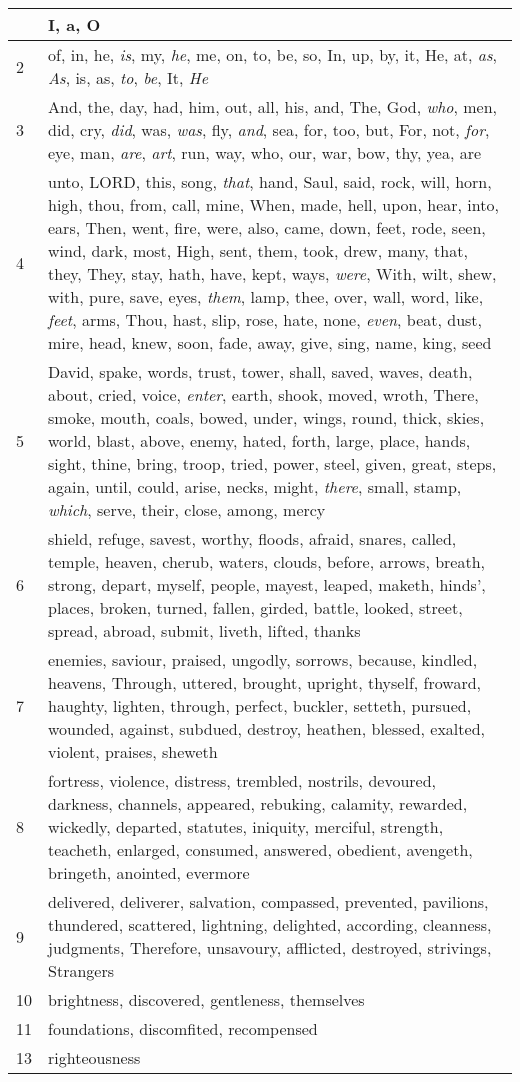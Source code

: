 \begin{longtable}{l|p{3.75in}}
\hline \hline
\endlastfoot
1 & I, a, O \\ \hline
2 & of, in, he, \emph{is}, my, \emph{he}, me, on, to, be, so, In, up, by, it, He, at, \emph{as}, \emph{As}, is, as, \emph{to}, \emph{be}, It, \emph{He} \\ \hline
3 & And, the, day, had, him, out, all, his, and, The, God, \emph{who}, men, did, cry, \emph{did}, was, \emph{was}, fly, \emph{and}, sea, for, too, but, For, not, \emph{for}, eye, man, \emph{are}, \emph{art}, run, way, who, our, war, bow, thy, yea, are \\ \hline
4 & unto, LORD, this, song, \emph{that}, hand, Saul, said, rock, will, horn, high, thou, from, call, mine, When, made, hell, upon, hear, into, ears, Then, went, fire, were, also, came, down, feet, rode, seen, wind, dark, most, High, sent, them, took, drew, many, that, they, They, stay, hath, have, kept, ways, \emph{were}, With, wilt, shew, with, pure, save, eyes, \emph{them}, lamp, thee, over, wall, word, like, \emph{feet}, arms, Thou, hast, slip, rose, hate, none, \emph{even}, beat, dust, mire, head, knew, soon, fade, away, give, sing, name, king, seed \\ \hline
5 & David, spake, words, trust, tower, shall, saved, waves, death, about, cried, voice, \emph{enter}, earth, shook, moved, wroth, There, smoke, mouth, coals, bowed, under, wings, round, thick, skies, world, blast, above, enemy, hated, forth, large, place, hands, sight, thine, bring, troop, tried, power, steel, given, great, steps, again, until, could, arise, necks, might, \emph{there}, small, stamp, \emph{which}, serve, their, close, among, mercy \\ \hline
6 & shield, refuge, savest, worthy, floods, afraid, snares, called, temple, heaven, cherub, waters, clouds, before, arrows, breath, strong, depart, myself, people, mayest, leaped, maketh, hinds', places, broken, turned, fallen, girded, battle, looked, street, spread, abroad, submit, liveth, lifted, thanks \\ \hline
7 & enemies, saviour, praised, ungodly, sorrows, because, kindled, heavens, Through, uttered, brought, upright, thyself, froward, haughty, lighten, through, perfect, buckler, setteth, pursued, wounded, against, subdued, destroy, heathen, blessed, exalted, violent, praises, sheweth \\ \hline
8 & fortress, violence, distress, trembled, nostrils, devoured, darkness, channels, appeared, rebuking, calamity, rewarded, wickedly, departed, statutes, iniquity, merciful, strength, teacheth, enlarged, consumed, answered, obedient, avengeth, bringeth, anointed, evermore \\ \hline
9 & delivered, deliverer, salvation, compassed, prevented, pavilions, thundered, scattered, lightning, delighted, according, cleanness, judgments, Therefore, unsavoury, afflicted, destroyed, strivings, Strangers \\ \hline
10 & brightness, discovered, gentleness, themselves \\ \hline
11 & foundations, discomfited, recompensed \\ \hline
13 & righteousness \\ \hline
\end{longtable}
